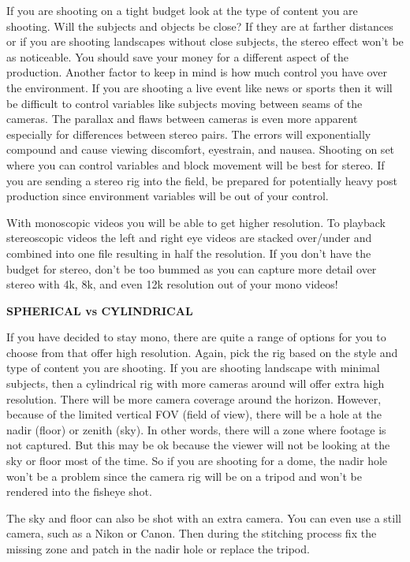 \begin{fullwidth}
If you are shooting on a tight budget look at the type of content you are shooting. Will the subjects and objects be close? If they are at farther distances or if you are shooting landscapes without close subjects, the stereo effect won’t be as noticeable. You should save your money for a different aspect of the production. Another factor to keep in mind is how much control you have over the environment. If you are shooting a live event like news or sports then it will be difficult to control variables like subjects moving between seams of the cameras. The parallax and flaws between cameras is even more apparent especially for differences between stereo pairs. The errors will exponentially compound and cause viewing discomfort, eyestrain, and nausea. Shooting on set where you can control variables and block movement will be best for stereo. If you are sending a stereo rig into the field, be prepared for potentially heavy post production since environment variables will be out of your control. 

With monoscopic videos you will be able to get higher resolution. To playback stereoscopic videos the left and right eye videos are stacked over/under and combined into one file resulting in half the resolution. If you don’t have the budget for stereo, don’t be too bummed as you can capture more detail over stereo with 4k, 8k, and even 12k resolution out of your mono videos!

{\bfseries SPHERICAL vs CYLINDRICAL}


If you have decided to stay mono, there are quite a range of options for you to choose from that offer high resolution. Again, pick the rig based on the style and type of content you are shooting. If you are shooting landscape with minimal subjects, then a cylindrical rig with more cameras around will offer extra high resolution. There will be more camera coverage around the horizon. However, because of the limited vertical FOV (field of view), there will be a hole at the nadir (floor) or zenith (sky). In other words, there will a zone where footage is not captured. But this may be ok because the viewer will not be looking at the sky or floor most of the time. So if you are shooting for a dome, the nadir hole won’t be a problem since the camera rig will be on a tripod and won't be rendered into the fisheye shot.

The sky and floor can also be shot with an extra camera. You can even use a still camera, such as a Nikon or Canon. Then during the stitching process fix the missing zone and patch in the nadir hole or replace the tripod. 


\end{fullwidth}
